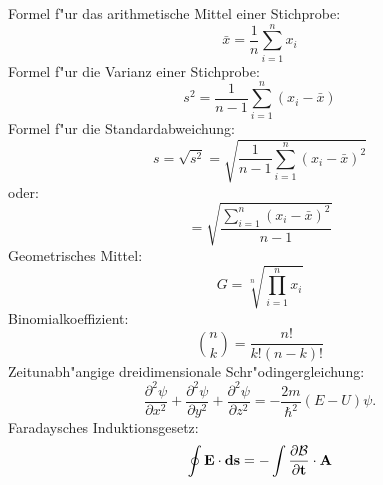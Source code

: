 \vspace{1cm} 
Formel f"ur das arithmetische Mittel einer Stichprobe: 
\begin{displaymath} 
\bar{x} = \frac{1}{n} \sum_{i=1}^{n} x_i 
\end{displaymath} 
Formel f"ur die Varianz einer Stichprobe: 
\begin{displaymath} 
s^2 = \frac{1}{n-1} \sum_{i=1}^{n} (x_i - \bar{x}) 
\end{displaymath} 
Formel f"ur die Standardabweichung: 
\begin{displaymath} 
s = \sqrt{s^2} = \sqrt{\frac{1}{n-1} \sum_{i=1}^{n} (x_i - \bar{x})^2} 
\end{displaymath} 
oder: 
\begin{displaymath} 
= \sqrt{\frac{ \sum_{i=1}^{n} (x_i - \bar{x})^2}{n-1}} 
\end{displaymath} 
Geometrisches Mittel: 
\begin{displaymath} 
G = \sqrt[n]{ \prod^n_{i=1} x_i} 
\end{displaymath} 
Binomialkoeffizient: 
\begin{displaymath} 
{n \choose k} = \frac{ n! }{ k! (n-k) !} 
\end{displaymath} 
Zeitunabh"angige dreidimensionale Schr"odingergleichung: 
\begin{displaymath} 
\frac{\partial^2 \psi}{\partial x ^2} + \frac{\partial^2 \psi}{\partial y ^2} + \frac{\partial^2 \psi}{\partial z ^2} = - \frac{2m}{\hbar^2}(E -U)\psi. 
\end{displaymath} 
Faradaysches Induktionsgesetz: 
\begin{displaymath} 
\oint \bf{E} \cdot ds = -\int \frac{\partial \mathcal{B}}{\partial t} \cdot \bf{A} 
\end{displaymath} 

